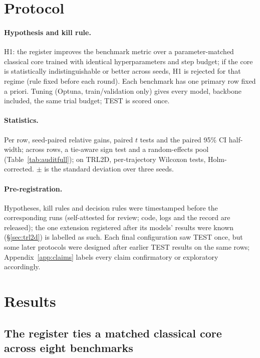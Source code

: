 \documentclass{article}
\begin{document}
\section{Protocol}
\label{sec:protocol}

\paragraph{Hypothesis and kill rule.} H1: the register improves the benchmark metric over a parameter-matched
classical core trained with identical hyperparameters and step budget; if the core is statistically indistinguishable
or better across seeds, H1 is rejected for that regime (rule fixed before each round). Each benchmark has one primary
row fixed a priori. Tuning (Optuna, train/validation only) gives every model, backbone included, the same trial
budget; TEST is scored once.

\paragraph{Statistics.} Per row, seed-paired relative gains, paired $t$ tests and the paired 95\% CI half-width;
across rows, a tie-aware sign test and a random-effects pool (Table~\ref{tab:auditfull}); on TRL2D, per-trajectory
Wilcoxon tests, Holm-corrected. $\pm$ is the standard deviation over three seeds.

\paragraph{Pre-registration.} Hypotheses, kill rules and decision rules were timestamped before the corresponding
runs (self-attested for review; code, logs and the record are released); the one extension registered after its
models' results were known (\S\ref{sec:trl2d}) is labelled as such. Each final configuration saw TEST once, but some
later protocols were designed after earlier TEST results on the same rows; Appendix~\ref{app:claims} labels every claim
confirmatory or exploratory accordingly.

\section{Results}
\label{sec:results}

\subsection{The register ties a matched classical core across eight benchmarks}
\label{sec:audit}
\end{document}
